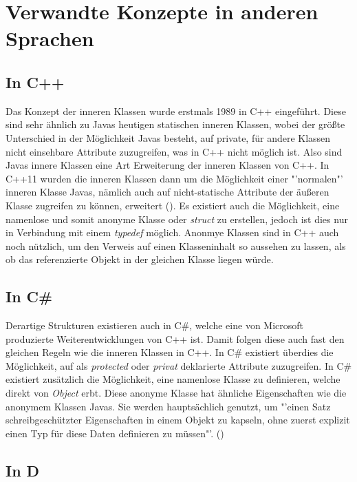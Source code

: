 \chapter{Verwandte Konzepte in anderen Sprachen}
\section{In C++}

Das Konzept der inneren Klassen wurde erstmals 1989 in C++ eingeführt.
Diese sind sehr ähnlich zu Javas heutigen statischen inneren Klassen, wobei der größte Unterschied in der Möglichkeit Javas besteht, auf private, für andere Klassen nicht einsehbare Attribute zuzugreifen, was in C++ nicht möglich ist.
Also sind Javas innere Klassen eine Art Erweiterung der inneren Klassen von C++.
In C++11 wurden die inneren Klassen dann um die Möglichkeit einer "'normalen"' inneren Klasse Javas,
 nämlich auch auf nicht-statische Attribute der äußeren Klasse zugreifen zu können, erweitert (\cite{Ellis2007}).
Es existiert auch die Möglichkeit, eine namenlose und somit anonyme Klasse oder {\it struct} zu erstellen, jedoch
ist dies nur in Verbindung mit einem {\it typedef} möglich. Anonmye Klassen sind in C++ auch noch nützlich, um den Verweis auf einen Klasseninhalt so aussehen zu lassen, als ob das
referenzierte Objekt in der gleichen Klasse liegen würde.

\section{In C\#}

Derartige Strukturen existieren auch in C\#, welche eine von Microsoft produzierte Weiterentwicklungen von C++ ist.
Damit folgen diese auch fast den gleichen Regeln wie die inneren Klassen in C++.
In C\# existiert überdies die Möglichkeit, auf als {\it protected} oder {\it privat} deklarierte Attribute zuzugreifen.
In C\# existiert zusätzlich die Möglichkeit, eine namenlose
Klasse zu definieren, welche direkt von {\it Object} erbt. Diese anonyme Klasse hat ähnliche Eigenschaften wie die anonymem Klassen Javas. Sie werden hauptsächlich genutzt,
um "'einen Satz schreibgeschützter Eigenschaften in einem Objekt zu kapseln, ohne zuerst explizit einen Typ für diese Daten definieren zu müssen"'. (\cite{Microsoft:Csharp})

\newpage
\section{In D}

